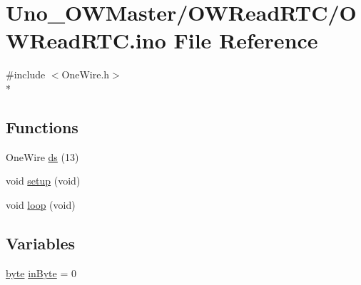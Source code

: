 \hypertarget{OWReadRTC_8ino}{\section{Uno\-\_\-\-O\-W\-Master/\-O\-W\-Read\-R\-T\-C/\-O\-W\-Read\-R\-T\-C.ino File Reference}
\label{OWReadRTC_8ino}
}
{\ttfamily \#include $<$One\-Wire.\-h$>$}\\*
\subsection*{Functions}
\begin{DoxyCompactItemize}
\item 
One\-Wire \hyperlink{OWReadRTC_8ino_a7ac2589d8de3c5bc02dcfe7fc62068e7}{ds} (13)
\item 
void \hyperlink{OWReadRTC_8ino_a7dfd9b79bc5a37d7df40207afbc5431f}{setup} (void)
\item 
void \hyperlink{OWReadRTC_8ino_a0b33edabd7f1c4e4a0bf32c67269be2f}{loop} (void)
\end{DoxyCompactItemize}
\subsection*{Variables}
\begin{DoxyCompactItemize}
\item 
\hyperlink{Arduino_8h_ab8ef12fab634c171394422d0ee8baf94}{byte} \hyperlink{OWReadRTC_8ino_a62cd173143ff9c15a38fd17ab56970c9}{in\-Byte} = 0
\end{DoxyCompactItemize}


